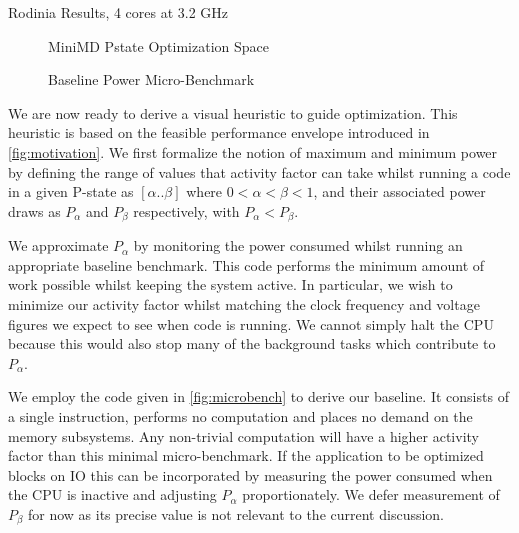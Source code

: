 \begin{table}
\centering

\caption{Rodinia Results, 4 cores at 3.2 GHz}
\end{table} 


\begin{figure}
\centering

\caption{MiniMD Pstate Optimization Space}
\label{fig:minimd-pstates}
\end{figure}


\begin{figure}[ht]                                                               
\centering                                                                      
\lstset{basicstyle=\ttfamily\footnotesize\bfseries, frame=tb} %
              
\caption{Baseline Power Micro-Benchmark}                            
\label{fig:microbench}                                                           
\end{figure}  



We are now ready to derive a visual heuristic to guide optimization. This heuristic is based on the feasible performance envelope introduced in \autoref{fig:motivation}. We first formalize the notion of maximum and minimum power by defining the range of values that activity factor can take whilst running a code in a given P-state as $[\alpha  .. \beta]$ where $0 < \alpha < \beta < 1$, and their associated power draws as $P_{\alpha}$ and $P_{\beta}$ respectively, with $P_{\alpha} < P_{\beta}$. 


We approximate $P_{\alpha}$ by monitoring the power consumed whilst running an appropriate baseline benchmark. This code performs the minimum amount of work possible whilst keeping the system active. In particular, we wish to minimize our activity factor whilst matching the clock frequency and voltage figures we expect to see when code is running. We cannot simply halt the CPU because this would also stop many of the background tasks which contribute to $P_{\alpha}$.

We employ the code given in \autoref{fig:microbench} to derive our baseline.  It consists of a single instruction, performs no computation and places no demand on the memory subsystems. Any non-trivial computation will have a higher activity factor than this minimal micro-benchmark. If the application to be optimized blocks on IO this can be incorporated by measuring the power consumed when the CPU is inactive and adjusting $P_\alpha$ proportionately. We defer measurement of $P_{\beta}$ for now as its precise value is not relevant to the current discussion. 
